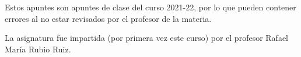 \begin{dedication}
    \begin{flushright}
        Estos apuntes son apuntes de clase del curso 2021-22, por lo que pueden contener errores al no estar revisados por el profesor de la materia.
        
        La asignatura fue impartida (por primera vez este curso) por el profesor Rafael María Rubio Ruiz.
    \end{flushright}
\end{dedication}